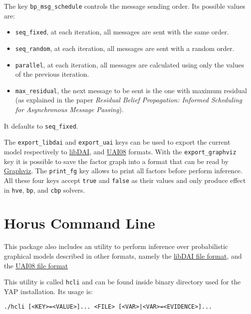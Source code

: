 \documentclass{article}
\begin{document}
The key \texttt{bp\_msg\_schedule} controls the message sending order. Its possible values are:
\begin{itemize}
 \item \texttt{seq\_fixed}, at each iteration, all messages are sent with the same order.

 \item \texttt{seq\_random}, at each iteration, all messages are sent with a random order.

 \item \texttt{parallel}, at each iteration, all messages are calculated using only the values of the previous iteration.

 \item \texttt{max\_residual}, the next message to be sent is the one with maximum residual (as explained in the paper \textit{Residual Belief Propagation: Informed Scheduling for Asynchronous Message Passing}).
\end{itemize}
It defaults to \texttt{seq\_fixed}.

The \texttt{export\_libdai} and \texttt{export\_uai} keys can be used to export the current model respectively to \href{http://cs.ru.nl/~jorism/libDAI/doc/fileformats.html}{libDAI}, and \href{http://graphmod.ics.uci.edu/uai08/FileFormat}{UAI08} formats. With the \texttt{export\_graphviz} key it is possible to save the factor graph into a format that can be read by \href{http://www.graphviz.org/}{Graphviz}. The \texttt{print\_fg} key allows to print all factors before perform inference. All these four keys accept \texttt{true} and \texttt{false} as their values and only produce effect in \texttt{hve}, \texttt{bp}, and \texttt{cbp} solvers.

\section{Horus Command Line}
This package also includes an utility to perform inference over probabilistic graphical models described in other formats, namely the \href{http://cs.ru.nl/~jorism/libDAI/doc/fileformats.html}{libDAI file format}, and the \href{http://graphmod.ics.uci.edu/uai08/FileFormat}{UAI08 file format}

This utility is called \texttt{hcli} and can be found inside binary directory used for the YAP installation. Its usage is:

\begin{verbatim}
./hcli [<KEY>=<VALUE>]... <FILE> [<VAR>|<VAR>=<EVIDENCE>]...
\end{verbatim}
\end{document}

